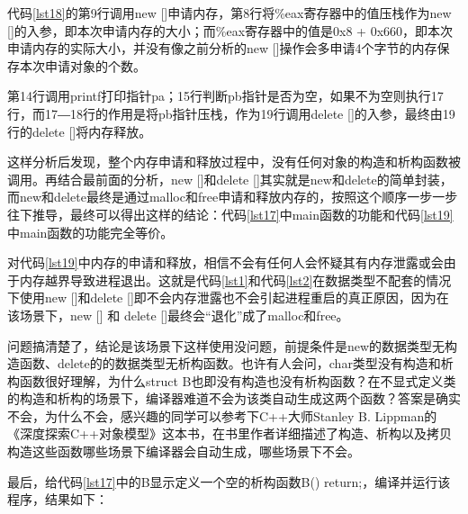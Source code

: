 \documentclass[a4paper, 12pt, titlepage]{article}
\newlength{\du}
\begin{document}
代码\ref{lst18}的第9行调用new []申请内存，第8行将\%eax寄存器中的值压栈作为new []的入参，即本次申请内存的大小；而\%eax寄存器中的值是0x8 + 0x660，即本次申请内存的实际大小，并没有像之前分析的new []操作会多申请4个字节的内存保存本次申请对象的个数。

第14行调用printf打印指针pa；15行判断pb指针是否为空，如果不为空则执行17行，而17―18行的作用是将pb指针压栈，作为19行调用delete []的入参，最终由19行的delete []将内存释放。

这样分析后发现，整个内存申请和释放过程中，没有任何对象的构造和析构函数被调用。再结合最前面的分析，new []和delete []其实就是new和delete的简单封装，而new和delete最终是通过malloc和free申请和释放内存的，按照这个顺序一步一步往下推导，最终可以得出这样的结论：代码\ref{lst17}中main函数的功能和代码\ref{lst19}中main函数的功能完全等价。
\begin{spacing}{1.0}
  
\end{spacing}

对代码\ref{lst19}中内存的申请和释放，相信不会有任何人会怀疑其有内存泄露或会由于内存越界导致进程退出。这就是代码\ref{lst1}和代码\ref{lst2}在数据类型不配套的情况下使用new []和delete []即不会内存泄露也不会引起进程重启的真正原因，因为在该场景下，new [] 和 delete []最终会“退化”成了malloc和free。

问题搞清楚了，结论是该场景下这样使用没问题，前提条件是new的数据类型无构造函数、delete的的数据类型无析构函数。也许有人会问，char类型没有构造和析构函数很好理解，为什么struct B也即没有构造也没有析构函数？在不显式定义类的构造和析构的场景下，编译器难道不会为该类自动生成这两个函数？答案是确实不会，为什么不会，感兴趣的同学可以参考下C++大师Stanley B. Lippman的《深度探索C++对象模型》这本书，在书里作者详细描述了构造、析构以及拷贝构造这些函数哪些场景下编译器会自动生成，哪些场景下不会。

最后，给代码\ref{lst17}中的B显示定义一个空的析构函数B() {return;}，编译并运行该程序，结果如下：
\begin{spacing}{1.0}
  
\end{spacing}
\end{document}
